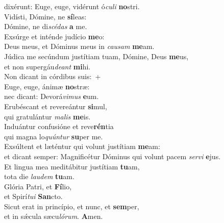 \evenverse dixérunt: Euge, euge, vidérunt ó\textit{cu}\textit{li} \textbf{no}stri.\\
\oddverse Vidísti, Dómine, ne \textbf{sí}leas:~\*\\
\oddverse Dómine, ne di\textit{scé}\textit{das} \textbf{a} me.\\
\evenverse Exsúrge et inténde judício \textbf{me}o:~\*\\
\evenverse Deus meus, et Dóminus meus in \textit{cau}\textit{sam} \textbf{me}am.\\
\oddverse Júdica me secúndum justítiam tuam, Dómine, Deus \textbf{me}us,~\*\\
\oddverse et non supergáu\textit{de}\textit{ant} \textbf{mi}hi.\\
\evenverse Non dicant in córdibus suis:~+\\
\evenverse  Euge, euge, ánimæ \textbf{no}stræ:~\*\\
\evenverse nec dicant: Devorá\textit{vi}\textit{mus} \textbf{e}um.\\
\oddverse Erubéscant et revereántur \textbf{si}mul,~\*\\
\oddverse qui gratulántur \textit{ma}\textit{lis} \textbf{me}is.\\
\evenverse Induántur confusióne et reve\textbf{rén}tia~\*\\
\evenverse qui magna lo\textit{quún}\textit{tur} \textbf{su}per me.\\
\oddverse Exsúltent et læténtur qui volunt justítiam \textbf{me}am:~\*\\
\oddverse et dicant semper: Magnificétur Dóminus qui volunt pacem \textit{ser}\textit{vi} \textbf{e}jus.\\
\evenverse Et lingua mea meditábitur justítiam \textbf{tu}am,~\*\\
\evenverse tota die \textit{lau}\textit{dem} \textbf{tu}am.\\
\oddverse Glória Patri, et \textbf{Fí}lio,~\*\\
\oddverse et Spirí\textit{tu}\textit{i} \textbf{San}cto.\\
\evenverse Sicut erat in princípio, et nunc, et \textbf{sem}per,~\*\\
\evenverse et in sǽcula sæcu\textit{ló}\textit{rum}. \textbf{A}men.\\
